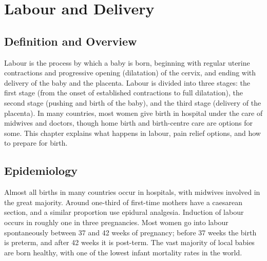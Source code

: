 \chapter{Labour and Delivery}

\section*{Definition and Overview}
Labour is the process by which a baby is born, beginning with regular uterine contractions and progressive opening (dilatation) of the cervix, and ending with delivery of the baby and the placenta. Labour is divided into three stages: the first stage (from the onset of established contractions to full dilatation), the second stage (pushing and birth of the baby), and the third stage (delivery of the placenta). In many countries, most women give birth in hospital under the care of midwives and doctors, though home birth and birth-centre care are options for some. This chapter explains what happens in labour, pain relief options, and how to prepare for birth.

\section*{Epidemiology}
Almost all births in many countries occur in hospitals, with midwives involved in the great majority. Around one-third of first-time mothers have a caesarean section, and a similar proportion use epidural analgesia. Induction of labour occurs in roughly one in three pregnancies. Most women go into labour spontaneously between 37 and 42 weeks of pregnancy; before 37 weeks the birth is preterm, and after 42 weeks it is post-term. The vast majority of local babies are born healthy, with one of the lowest infant mortality rates in the world.

